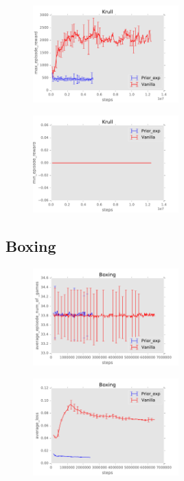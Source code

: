 \documentclass{sig-alternate}
\begin{document}
\begin{figure}
    \centering
    \includegraphics[width=0.5\textwidth]{../results/Krull/Comparisons/Prior_exp/Prior_exp-baseline-max_episode_reward.pdf}
\end{figure}


\begin{figure}
    \centering
    \includegraphics[width=0.5\textwidth]{../results/Krull/Comparisons/Prior_exp/Prior_exp-baseline-min_episode_reward.pdf}
\end{figure}
\FloatBarrier

\subsection{Boxing}\label{Appendix boxing prior}

\begin{figure}
    \centering
    \includegraphics[width=0.5\textwidth]{../results/Boxing/Comparisons/Prior_exp/Prior_exp-baseline-average_episode_num_of_games.pdf}
\end{figure}


\begin{figure}
    \centering
    \includegraphics[width=0.5\textwidth]{../results/Boxing/Comparisons/Prior_exp/Prior_exp-baseline-average_loss.pdf}
\end{figure}
\end{document}
